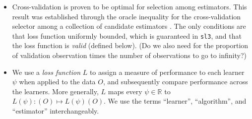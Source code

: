 \documentclass[12pt, krantz2,]{krantz}
\newcommand{\passthrough}[1]{#1}
\theoremstyle{definition}
\theoremstyle{definition}
\theoremstyle{definition}
\newcommand{\R}{\mathbb{R}}
\newcommand{\1}{\mathbbm{1}}
\begin{document}
\begin{itemize}
\item
  Cross-validation is proven to be optimal for selection among estimators. This
  result was established through the oracle inequality for the cross-validation
  selector among a collection of candidate estimators \citep{vdl2003unified, vaart2006oracle}. The only conditions are that loss function uniformly
  bounded, which is guaranteed in \passthrough{\lstinline!sl3!}, and that the loss function is \emph{valid}
  (defined below). (Do we also need for the proportion of validation observation
  times the number of observations to go to infinity?)
\item
  We use a \emph{loss function} \(L\) to assign a measure of performance to each
  learner \(\psi\) when applied to the data \(O\), and subsequently compare
  performance across the learners. More generally, \(L\) maps every \(\psi \in \R\)
  to \(L(\psi) : (O) \mapsto L(\psi)(O)\). We use the terms ``learner'',
  ``algorithm'', and ``estimator'' interchangeably.


\end{itemize}
\end{document}
